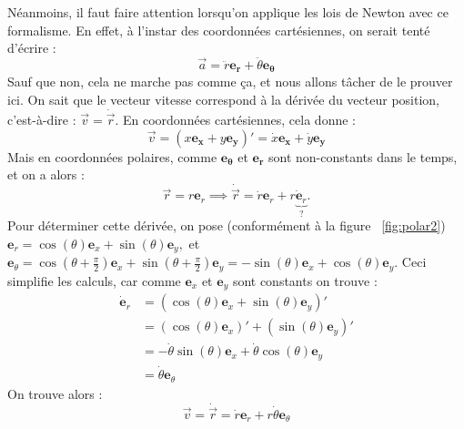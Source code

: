 \documentclass{article}
\begin{document}
\noindent Néanmoins, il faut faire attention lorsqu'on applique les lois de Newton avec ce formalisme. En effet, à l'instar des coordonnées cartésiennes, on serait tenté d'écrire :
\begin{equation*}
    \vec a = \ddot r \mathbf{e_r} + \ddot \theta \mathbf{e_\theta}
\end{equation*}
Sauf que non, cela ne marche pas comme ça, et nous allons tâcher de le prouver ici. On sait que le vecteur vitesse correspond à la dérivée du vecteur position, c'est-à-dire : $\vec{v} = \dot{\vec{r}}$.
En coordonnées cartésiennes, cela donne : 
\begin{equation*}
    \vec v = (x\mathbf{e_x} + y\mathbf{e_y})' = \dot x\mathbf{e_x} + \dot y\mathbf{e_y}
\end{equation*}
Mais en coordonnées polaires, comme  $\mathbf{e_\theta}$ et  $\mathbf{e_r}$ sont non-constants dans le temps, et on a alors : 
\[\Vec{r}=r\mathbf{e}_r \implies \Dot{\Vec{r}} = \dot{r}\mathbf{e}_r+r\underbrace{\Dot{\mathbf{e}}_r}_{?}.\]
    Pour déterminer cette dérivée, on pose (conformément à la figure ~\ref{fig:polar2}) $\mathbf{e}_r=\cos(\theta)\mathbf{e}_x+\sin(\theta)\mathbf{e}_y,$ et $\mathbf{e}_\theta=\cos(\theta+\frac{\pi}{2})\mathbf{e}_x+\sin(\theta+\frac{\pi}{2})\mathbf{e}_y=-\sin(\theta)\mathbf{e}_x+\cos(\theta)\mathbf{e}_y.$ Ceci simplifie les calculs, car comme $\mathbf{e}_x$ et $\mathbf{e}_y$ sont constants on trouve :
\begin{align*}
        \dot{\mathbf{e}}_r&=\left(\cos(\theta)\mathbf{e}_x+\sin(\theta)\mathbf{e}_y\right)'\\
                          &=(\cos(\theta)\mathbf{e}_x)'+(\sin(\theta)\mathbf{e}_y)'\\
                          &=-\dot \theta\sin(\theta)\mathbf{e}_x+\dot \theta\cos(\theta)\mathbf{e}_y\\
                          &=\boxed{\dot \theta\mathbf{e}_\theta}
    \end{align*}    
On trouve alors :
\begin{equation*}
    \vec{v} = \dot{\vec{r}} = \dot{r}\mathbf{e}_r+r\dot \theta\mathbf{e}_\theta
\end{equation*}
\end{document}
